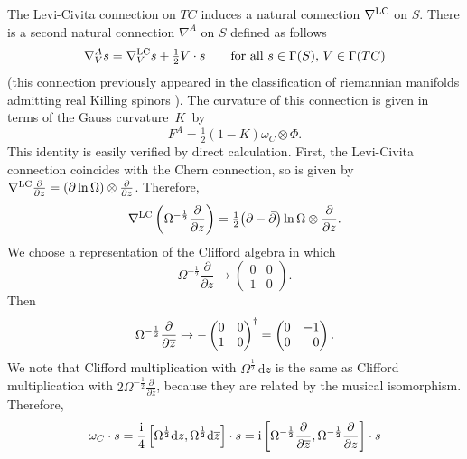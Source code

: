 \documentclass[pdftex]{sigma}
\newcommand{\1}{{\mathbb{1}}}
\def \d{\mathrm{d}}
\newcommand{\ol}{\overline}
\numberwithin{equation}{section}
\begin{document}
The Levi-Civita connection on $TC$ induces a natural connection $\nabla^{\rm LC}$ on $S$. There is a second natural connection $\nabla^A$ on $S$ defined as follows
\begin{equation}
\label{baer connection}
\nabla^A_Vs = \nabla^{\rm LC}_Vs + \tfrac{1}{2}V\cdot s\qquad \text{for all } s\in\Gamma(S),\,V\in\Gamma(TC)
\end{equation}
(this connection previously appeared in the classification of riemannian manifolds admitting real Killing spinors \cite{Bar1993}). The curvature of this connection is given in terms of the Gauss curvature~$K$~by
\begin{equation}
\label{spinor curvature}
F^A=\tfrac{1}{2}(1-K)\omega_C\otimes\Phi.
\end{equation}
This identity is easily verified by direct calculation. First, the Levi-Civita connection coincides with the Chern connection, so is given by $\nabla^{\rm LC}\frac{\partial}{\partial z} = (\partial \ln\Omega)\otimes \frac{\partial}{\partial z}$.
Therefore,
\[
\nabla^{\rm LC}\left(\Omega^{-\frac12}\frac{\partial}{\partial z}\right)=\tfrac{1}{2}\bigl(\partial-\bar\partial\bigr)\ln\Omega \otimes\frac{\partial}{\partial z}.
\]
We choose a representation of the Clifford algebra in which
\begin{equation*}
\Omega^{-\frac12}\frac{\partial}{\partial z} \mapsto \begin{pmatrix}0&0\\1&0\end{pmatrix}.
\end{equation*}
Then
\begin{equation*}
\Omega^{-\frac12}\frac{\partial}{\partial \ol{z}} \mapsto -\begin{pmatrix}0&0\\1&0\end{pmatrix}^\dagger = \begin{pmatrix}0&-1\\0&\hphantom{-}0\end{pmatrix}.
\end{equation*}
We note that Clifford multiplication with $\Omega^{\frac12}\,\d z$ is the same as Clifford multiplication with $2\Omega^{-\frac12}\frac{\partial}{\partial \ol{z}}$, because they are related by the musical isomorphism. Therefore,
\begin{equation*}
\omega_C\cdot s = \frac{{\rm i}}{4}\left[\Omega^{\frac12} \d z,\Omega^{\frac12} \d\ol{z}\right]\cdot s = {\rm i}\left[\Omega^{-\frac12}\frac{\partial}{\partial\ol{z}},\Omega^{-\frac12}\frac{\partial}{\partial z}\right]\cdot s
\end{equation*}
\end{document}
